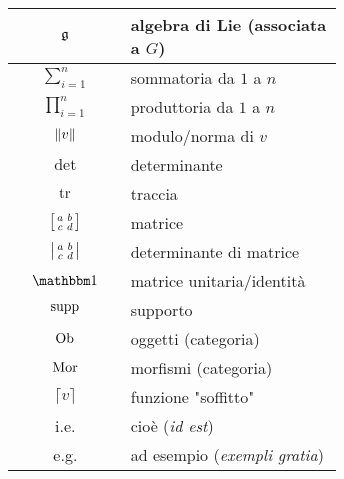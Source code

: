 \begin{table}[H]
{\begin{tabular}{|c|p{0.65\linewidth}|}
					\hline
					$ \mathfrak{g} $ & algebra di Lie (associata a $ G $) \\
					\hline
					$ \sum_{i=1}^{n} $ & sommatoria da $ 1 $ a $ n $ \\
					\hline
					$ \prod_{i=1}^{n} $ & produttoria da $ 1 $ a $ n $ \\
					\hline
					$ \norm{v} $ & modulo/norma di $ v $ \\
					\hline
					$ \det $ & determinante \\
					\hline
					$ \tr $ & traccia \\
					\hline
					$ \sbmqty{ a & b \\ c & d } $ & matrice \\
					\hline
					$ \smdet{ a & b \\ c & d } $ & determinante di matrice \\
					\hline
					$ \bigone $ & matrice unitaria/identità \\
					\hline
					$ \operatorname{supp} $ & supporto \\
					\hline
					$ \operatorname{Ob} $ & oggetti (categoria) \\
					\hline
					$ \operatorname{Mor} $ & morfismi (categoria) \\
					\hline
					$ \lceil v \rceil $ & funzione "soffitto" \\
					\hline
					i.e. & cioè (\textit{id est}) \\
					\hline
					e.g. & ad esempio (\textit{exempli gratia}) \\
					\hline
				\end{tabular}
				}
\end{table}
